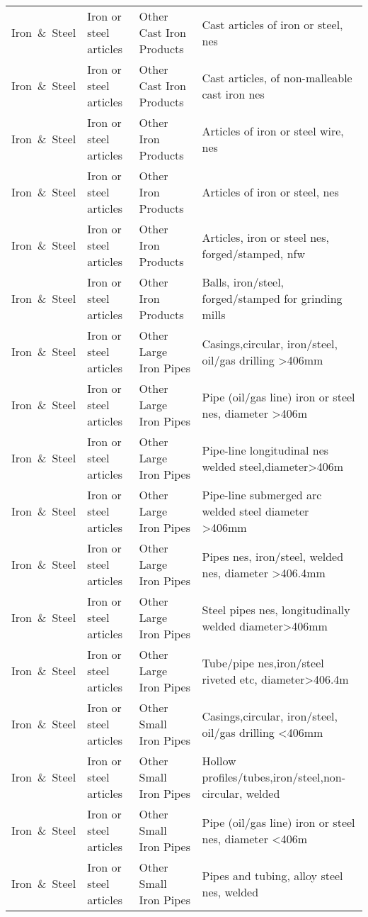 \begin{appendices}
\begin{xltabular}{\textwidth}{|p{0.07\textwidth}|p{0.12\textwidth}|p{0.20\textwidth}|p{0.5\textwidth}|}
Iron\ \&\ Steel & Iron or steel articles & Other Cast Iron Products & Cast articles of iron or steel, nes \\
Iron\ \&\ Steel & Iron or steel articles & Other Cast Iron Products & Cast articles, of non-malleable cast iron nes \\
Iron\ \&\ Steel & Iron or steel articles & Other Iron Products & Articles of iron or steel wire, nes \\
Iron\ \&\ Steel & Iron or steel articles & Other Iron Products & Articles of iron or steel, nes \\
Iron\ \&\ Steel & Iron or steel articles & Other Iron Products & Articles, iron or steel nes, forged/stamped, nfw \\
Iron\ \&\ Steel & Iron or steel articles & Other Iron Products & Balls, iron/steel, forged/stamped for grinding mills \\
Iron\ \&\ Steel & Iron or steel articles & Other Large Iron Pipes & Casings,circular, iron/steel, oil/gas drilling >406mm \\
Iron\ \&\ Steel & Iron or steel articles & Other Large Iron Pipes & Pipe (oil/gas line) iron or steel nes, diameter >406m \\
Iron\ \&\ Steel & Iron or steel articles & Other Large Iron Pipes & Pipe-line longitudinal nes welded steel,diameter>406m \\
Iron\ \&\ Steel & Iron or steel articles & Other Large Iron Pipes & Pipe-line submerged arc welded steel diameter >406mm \\
Iron\ \&\ Steel & Iron or steel articles & Other Large Iron Pipes & Pipes nes, iron/steel, welded nes, diameter >406.4mm \\
Iron\ \&\ Steel & Iron or steel articles & Other Large Iron Pipes & Steel pipes nes, longitudinally welded diameter>406mm \\
Iron\ \&\ Steel & Iron or steel articles & Other Large Iron Pipes & Tube/pipe nes,iron/steel riveted etc, diameter>406.4m \\
Iron\ \&\ Steel & Iron or steel articles & Other Small Iron Pipes & Casings,circular, iron/steel, oil/gas drilling <406mm \\
Iron\ \&\ Steel & Iron or steel articles & Other Small Iron Pipes & Hollow profiles/tubes,iron/steel,non-circular, welded \\
Iron\ \&\ Steel & Iron or steel articles & Other Small Iron Pipes & Pipe (oil/gas line) iron or steel nes, diameter <406m \\
Iron\ \&\ Steel & Iron or steel articles & Other Small Iron Pipes & Pipes and tubing, alloy steel nes, welded \\

\end{xltabular}
\end{appendices}
